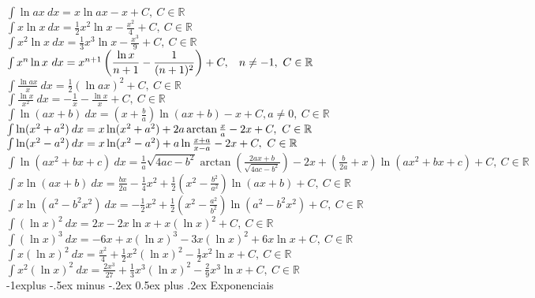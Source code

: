 \documentclass[10pt,landscape]{article}
\makeatletter
\renewcommand{\subsection}{\@startsection{subsection}{2}{0mm}%
                                {-1explus -.5ex minus -.2ex}%
                                {0.5ex plus .2ex}%
                                {\normalfont\normalsize\bfseries}}
\makeatother
\begin{document}
\begin{multicols}{3}
$\int \ln ax\  dx = x \ln ax - x + C,\ C \in \mathbb{R}$\\
$\int x \ln x \ dx = \frac{1}{2} x^2 \ln x-\frac{x^2}{4} + C,\ C \in \mathbb{R}$\\
$\int x^2 \ln x \ dx = \frac{1}{3} x^3 \ln x-\frac{x^3}{9} + C,\ C \in \mathbb{R}$\\
$\int x^n \ln x\ dx = x^{n+1}\left( \dfrac{\ln x}{n+1}-\dfrac{1}{(n+1)^2}\right) + C,\hspace{2ex} n\neq -1,\ C \in \mathbb{R}$\\
$\int \frac{\ln ax}{x}\ dx = \frac{1}{2}\left ( \ln ax \right)^2 + C,\ C \in \mathbb{R}$\\
$\int \frac{\ln x}{x^2}\ dx = -\frac{1}{x}-\frac{\ln x}{x} + C,\ C \in \mathbb{R}$\\
$\int \ln (ax + b) \ dx = \left ( x + \frac{b}{a} \right) \ln (ax+b) - x + C, a\ne 0,\ C \in \mathbb{R}$\\
$\int \ln  ( x^2 + a^2 )\hspace{.5ex} {dx} = x \ln (x^2 + a^2  ) +2a\arctan \frac{x}{a} - 2x + C,\ C \in \mathbb{R}$\\
$\int \ln  ( x^2 - a^2 )\hspace{.5ex} {dx} = x \ln (x^2 - a^2  ) +a\ln \frac{x+a}{x-a} - 2x + C,\ C \in \mathbb{R}$\\
$\int \ln \left ( ax^2 + bx + c\right) \ dx  = \frac{1}{a}\sqrt{4ac-b^2}\arctan(\frac{2ax+b}{\sqrt{4ac-b^2}})-2x + \left( \frac{b}{2a}+x \right )\ln \left (ax^2+bx+c \right) + C,\ C \in \mathbb{R}$\\
$\int x \ln (ax + b)\ dx = \frac{bx}{2a}-\frac{1}{4}x^2 +\frac{1}{2}\left(x^2-\frac{b^2}{a^2}\right)\ln (ax+b) + C,\ C \in \mathbb{R}$\\
$\int x \ln \left ( a^2 - b^2 x^2 \right )\ dx = -\frac{1}{2}x^2+ \frac{1}{2}\left( x^2 - \frac{a^2}{b^2} \right ) \ln \left (a^2 -b^2 x^2 \right) + C,\ C \in \mathbb{R}$\\
$\int (\ln x)^2\ dx = 2x - 2x \ln x + x (\ln x)^2 + C,\ C \in \mathbb{R}$\\
$\int (\ln x)^3\ dx = -6 x+x (\ln x)^3-3 x (\ln x)^2+6 x \ln x + C,\ C \in \mathbb{R}$\\
$\int x (\ln x)^2\ dx = \frac{x^2}{4}+\frac{1}{2} x^2 (\ln x)^2-\frac{1}{2} x^2 \ln x + C,\ C \in \mathbb{R}$\\
$\int x^2 (\ln x)^2\ dx = \frac{2 x^3}{27}+\frac{1}{3} x^3 (\ln x)^2-\frac{2}{9} x^3 \ln x + C,\ C \in \mathbb{R}$\\

\subsection{Exponenciais}


\end{multicols}
\end{document}
